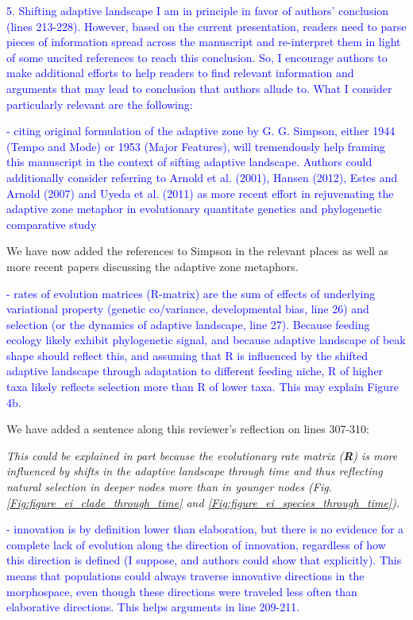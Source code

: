 \documentclass[12pt,letterpaper]{article}
\begin{document}
{\textcolor{blue}{5. Shifting adaptive landscape
I am in principle in favor of authors’ conclusion (lines 213-228). However, based on the current presentation, readers need to parse pieces of information spread across the manuscript and re-interpret them in light of some uncited references to reach this conclusion. So, I encourage authors to make additional efforts to help readers to find relevant information and arguments that may lead to conclusion that authors allude to. What I consider particularly relevant are the following:}

\textcolor{blue}{- citing original formulation of the adaptive zone by G. G. Simpson, either 1944 (Tempo and Mode) or 1953 (Major Features), will tremendously help framing this manuscript in the context of sifting adaptive landscape. Authors could additionally consider referring to Arnold et al. (2001), Hansen (2012), Estes and Arnold (2007) and Uyeda et al. (2011) as more recent effort in rejuvenating the adaptive zone metaphor in evolutionary quantitate genetics and phylogenetic comparative study}

We have now added the references to Simpson in the relevant places as well as more recent papers discussing the adaptive zone metaphors.

\textcolor{blue}{- rates of evolution matrices (R-matrix) are the sum of effects of underlying variational property (genetic co/variance, developmental bias, line 26) and selection (or the dynamics of adaptive landscape, line 27). Because feeding ecology likely exhibit phylogenetic signal, and because adaptive landscape of beak shape should reflect this, and assuming that R is influenced by the shifted adaptive landscape through adaptation to different feeding niche, R of higher taxa likely reflects selection more than R of lower taxa. This may explain Figure 4b.}

We have added a sentence along this reviewer’s reflection on lines 307-310: %

\noindent\textit{This could be explained in part because the evolutionary rate matrix (\textbf{R}) is more influenced by shifts in the adaptive landscape through time and thus reflecting natural selection in deeper nodes more than in younger nodes (Fig. \ref{Fig:figure_ei_clade_through_time} and \ref{Fig:figure_ei_species_through_time}).} %

\textcolor{blue}{- innovation is by definition lower than elaboration, but there is no evidence for a complete lack of evolution along the direction of innovation, regardless of how this direction is defined (I suppose, and authors could show that explicitly). This means that populations could always traverse innovative directions in the morphospace, even though these directions were traveled less often than elaborative directions. This helps arguments in line 209-211.}

}
\end{document}
